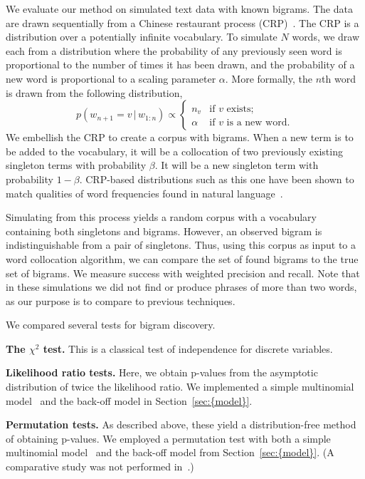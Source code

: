 \documentclass[11pt]{article}
\begin{document}
We evaluate our method on simulated text data with known bigrams.  The
data are drawn sequentially from a Chinese restaurant process
(CRP)~\citep{Pitman:2002}.  The CRP is a distribution over a
potentially infinite vocabulary.  To simulate $N$ words, we draw each
from a distribution where the probability of any previously seen word
is proportional to the number of times it has been drawn, and the
probability of a new word is proportional to a scaling parameter
$\alpha$.  More formally, the $n$th word is drawn from the following
distribution,
\begin{equation*}
  p(w_{n+1} = v {\,|\,} w_{1:n}) \propto
\begin{cases}
    n_v & \textrm{if $v$ exists;}\\
    \alpha & \textrm{if $v$ is a new word.}
\end{cases}
\end{equation*}
We embellish the CRP to create a corpus with bigrams.  When a new term
is to be added to the vocabulary, it will be a collocation of two
previously existing singleton terms with probability $\beta$.  It will
be a new singleton term with probability $1-\beta$.  CRP-based
distributions such as this one have been shown to match qualities of
word frequencies found in natural language~\cite{Goldwater:2006a}.

Simulating from this process yields a random corpus with a vocabulary
containing both singletons and bigrams.  However, an observed bigram
is indistinguishable from a pair of singletons.  Thus, using this corpus
as input to a word collocation algorithm, we can compare the set of
found bigrams to the true set of bigrams.  We measure success with
weighted precision and recall.  Note that in these simulations we did
not find or produce phrases of more than two words, as our purpose is
to compare to previous techniques.

We compared several tests for bigram discovery.

\textbf{The $\chi^2$ test.}  This is a classical test of
independence for discrete variables.

\textbf{Likelihood ratio tests.}  Here, we obtain p-values from
the asymptotic distribution of twice the likelihood ratio.  We
implemented a simple multinomial model~\citep{Dunning:1993} and the
back-off model in {Section~\ref{sec:{model}}}.

\textbf{Permutation tests.}  As described above, these yield a
distribution-free method of obtaining p-values.  We employed a
permutation test with both a simple multinomial
model~\citep{Pedersen:1996} and the back-off model from {Section~\ref{sec:{model}}}.
(A comparative study was not performed in~\cite{Pedersen:1996}.)
\end{document}
